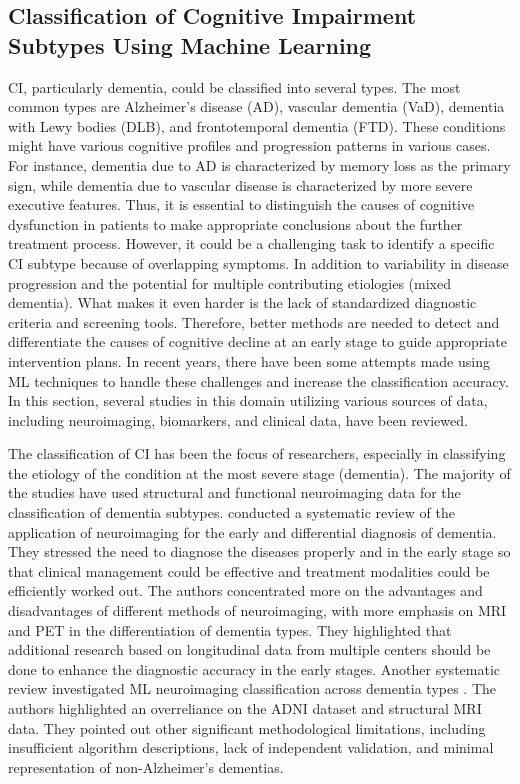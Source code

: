 \subsection{Classification of Cognitive Impairment Subtypes Using Machine Learning}
CI, particularly dementia, could be classified into several types. The most common types are Alzheimer’s disease (\acrshort{AD}), vascular dementia (\acrshort{VaD}), dementia with Lewy bodies (\acrshort{DLB}), and frontotemporal dementia (\acrshort{FTD}). These conditions might have various cognitive profiles and progression patterns in various cases. For instance, dementia due to AD is characterized by memory loss as the primary sign, while dementia due to vascular disease is characterized by more severe executive features. Thus, it is essential to distinguish the causes of cognitive dysfunction in patients to make appropriate conclusions about the further treatment process. However, it could be a challenging task to identify a specific CI subtype because of overlapping symptoms. In addition to variability in disease progression and the potential for multiple contributing etiologies (mixed dementia). What makes it even harder is the lack of standardized diagnostic criteria and screening tools. Therefore, better methods are needed to detect and differentiate the causes of cognitive decline at an early stage to guide appropriate intervention plans. In recent years, there have been some attempts made using ML techniques to handle these challenges and increase the classification accuracy. In this section, several studies in this domain utilizing various sources of data, including neuroimaging, biomarkers, and clinical data, have been reviewed.

The classification of CI has been the focus of researchers, especially in classifying the etiology of the condition at the most severe stage (dementia). The majority of the studies have used structural and functional neuroimaging data for the classification of dementia subtypes.  conducted a systematic review of the application of neuroimaging for the early and differential diagnosis of dementia. They stressed the need to diagnose the diseases properly and in the early stage so that clinical management could be effective and treatment modalities could be efficiently worked out. The authors concentrated more on the advantages and disadvantages of different methods of neuroimaging, with more emphasis on MRI and PET in the differentiation of dementia types. They highlighted that additional research based on longitudinal data from multiple centers should be done to enhance the diagnostic accuracy in the early stages. Another systematic review investigated ML neuroimaging classification across dementia types \cite{Borchert2023Artificial}. The authors highlighted an overreliance on the ADNI dataset and structural MRI data. They pointed out other significant methodological limitations, including insufficient algorithm descriptions, lack of independent validation, and minimal representation of non-Alzheimer’s dementias. 

